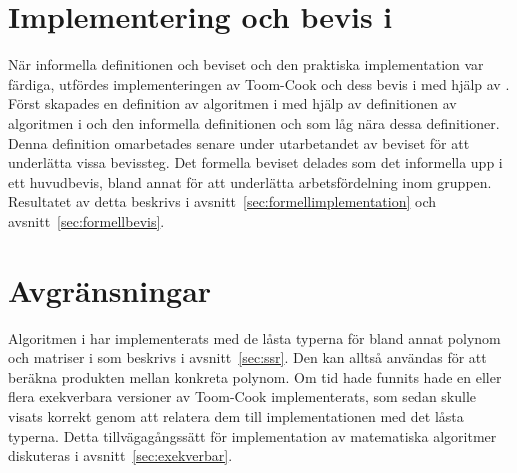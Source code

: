 \section{Implementering och bevis i \coq{}}
När informella definitionen och beviset och den praktiska implementation var
färdiga, utfördes implementeringen av Toom-Cook och dess bevis i \coq{} med
hjälp av \ssr{}. Först skapades en definition av algoritmen i \coq{} med hjälp
av definitionen av algoritmen i \haskell{} och den informella definitionen och
som låg nära dessa definitioner. Denna definition omarbetades senare under
utarbetandet av beviset för att underlätta vissa bevissteg. Det formella
beviset delades som det informella upp i ett huvudbevis, bland annat för att
underlätta arbetsfördelning inom gruppen. Resultatet av detta beskrivs i
avsnitt~\ref{sec:formellimplementation} och avsnitt~\ref{sec:formellbevis}.

\section{Avgränsningar}
Algoritmen i \coq{} har implementerats med de låsta typerna för bland annat
polynom och matriser i \ssr{} som beskrivs i avsnitt~\ref{sec:ssr}. Den kan
alltså användas för att beräkna produkten mellan konkreta polynom. Om tid hade
funnits hade en eller flera exekverbara versioner av Toom-Cook implementerats,
som sedan skulle visats korrekt genom att relatera dem till implementationen
med det låsta typerna. Detta tillvägagångssätt för implementation av
matematiska algoritmer diskuteras i avsnitt~\ref{sec:exekverbar}.
